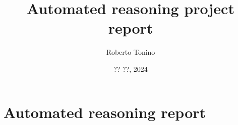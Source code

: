\documentclass[11pt]{article}
\title{Automated reasoning project report}
\author{Roberto Tonino}
\date{?? ??, 2024}
\begin{document}
\maketitle
\pagebreak


\section{Automated reasoning report}
\end{document}
